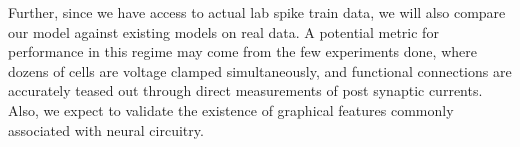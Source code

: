 \documentclass{article}
\begin{document}
Further, since we have access to actual lab spike train data, we will also compare our model against existing models on real data.  A potential metric for performance in this regime may come from the few experiments done, where dozens of cells are voltage clamped simultaneously, and functional connections are accurately teased out through direct measurements of post synaptic currents.  Also, we expect to validate the existence of graphical features commonly associated with neural circuitry.

\begin{small}

 
\end{small}
\end{document}
